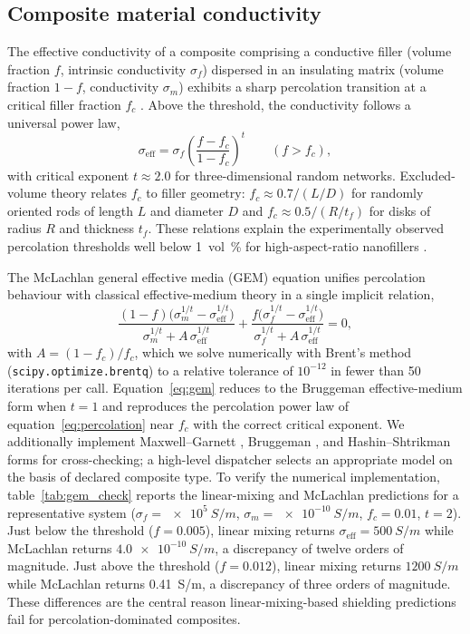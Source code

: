 \documentclass[review,3p,authoryear]{elsarticle}
\begin{document}
\subsection{Composite material conductivity}
\label{sec:composites}

The effective conductivity of a composite comprising a conductive filler (volume fraction $f$, intrinsic conductivity $\sigma_f$) dispersed in an insulating matrix (volume fraction $1-f$, conductivity $\sigma_m$) exhibits a sharp percolation transition at a critical filler fraction $f_c$ \citep{Kirkpatrick1973, Stauffer1994}. Above the threshold, the conductivity follows a universal power law,
\begin{equation}
\sigma_{\mathrm{eff}} = \sigma_f\!\left(\frac{f - f_c}{1 - f_c}\right)^t \qquad (f > f_c),
\label{eq:percolation}
\end{equation}
with critical exponent $t \approx 2.0$ for three-dimensional random networks. Excluded-volume theory \citep{Balberg1984, Celzard1996} relates $f_c$ to filler geometry: $f_c \approx 0.7/(L/D)$ for randomly oriented rods of length $L$ and diameter $D$ and $f_c \approx 0.5/(R/t_f)$ for disks of radius $R$ and thickness $t_f$. These relations explain the experimentally observed percolation thresholds well below \SI{1}{vol\%} for high-aspect-ratio nanofillers \citep{Bauhofer2009, AlSaleh2009}.

The McLachlan general effective media (GEM) equation \citep{McLachlan1990} unifies percolation behaviour with classical effective-medium theory in a single implicit relation,
\begin{equation}
\frac{(1-f)\bigl(\sigma_m^{1/t} - \sigma_{\mathrm{eff}}^{1/t}\bigr)}{\sigma_m^{1/t} + A\,\sigma_{\mathrm{eff}}^{1/t}}
+ \frac{f\bigl(\sigma_f^{1/t} - \sigma_{\mathrm{eff}}^{1/t}\bigr)}{\sigma_f^{1/t} + A\,\sigma_{\mathrm{eff}}^{1/t}} = 0,
\label{eq:gem}
\end{equation}
with $A = (1-f_c)/f_c$, which we solve numerically with Brent's method (\texttt{scipy.optimize.brentq}) to a relative tolerance of $10^{-12}$ in fewer than \num{50} iterations per call. Equation~\eqref{eq:gem} reduces to the Bruggeman effective-medium form when $t = 1$ and reproduces the percolation power law of equation~\eqref{eq:percolation} near $f_c$ with the correct critical exponent. We additionally implement Maxwell--Garnett \citep{MaxwellGarnett1904}, Bruggeman \citep{Bruggeman1935}, and Hashin--Shtrikman \citep{Hashin1962} forms for cross-checking; a high-level dispatcher selects an appropriate model on the basis of declared composite type. To verify the numerical implementation, table~\ref{tab:gem_check} reports the linear-mixing and McLachlan predictions for a representative system ($\sigma_f = \SI{e5}{S/m}$, $\sigma_m = \SI{e-10}{S/m}$, $f_c = 0.01$, $t = 2$). Just below the threshold ($f = 0.005$), linear mixing returns $\sigma_{\mathrm{eff}} = \SI{500}{S/m}$ while McLachlan returns $\SI{4.0e-10}{S/m}$, a discrepancy of twelve orders of magnitude. Just above the threshold ($f = 0.012$), linear mixing returns $\SI{1200}{S/m}$ while McLachlan returns \SI{0.41}{S/m}, a discrepancy of three orders of magnitude. These differences are the central reason linear-mixing-based shielding predictions fail for percolation-dominated composites.
\end{document}
